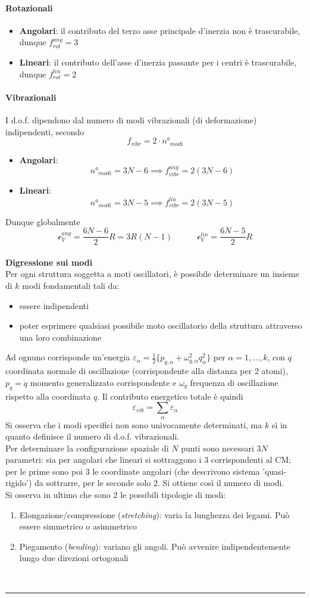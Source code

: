 \documentclass[10pt, oneside]{book}
\newcommand{\infobox}[2]{\vspace{0.5cm}~\\ \textbf{#1} \hrulefill \vspace{0.2cm}\\#2 {}\,\\\hrule \vspace{0.5cm}}
\newcommand{\ds}{\displaystyle}
\newcommand{\molhtv}{\mathcal{c}_V }
\begin{document}
\paragraph{Rotazionali} 
\begin{itemize}
\item \textbf{Angolari}: il contributo del terzo asse principale d'inerzia non è trascurabile, dunque $\ds f_{rot}^{ang} = 3$
\item \textbf{Lineari}: il contributo dell'asse d'inerzia passante per i centri è trascurabile, dunque $\ds f_{rot}^{lin} = 2$
\end{itemize}
\paragraph{Vibrazionali}
I d.o.f. dipendono dal numero di modi vibrazionali (di deformazione) indipendenti, secondo \[f_{vibr} = 2 \cdot n°_{modi}\]
\begin{itemize}
\item \textbf{Angolari}:
\[n°_{modi} = 3N - 6 \implies f_{vibr}^{ang} = 2 (3N - 6)\]
\item \textbf{Lineari}: \[n°_{modi} = 3N - 5 \implies f_{vibr}^{lin} = 2 (3N - 5)\]
\end{itemize}
Dunque globalmente
\[\molhtv^{ang} = \frac{6N - 6}{2} R = 3R (N-1) \quad \quad \quad \molhtv^{lin} = \frac{6N - 5}{2} R \]
\infobox{Digressione sui modi}{Per ogni struttura soggetta a moti oscillatori, è possibile determinare un insieme di $k$ modi fondamentali tali da:
\begin{itemize}
\item essere indipendenti
\item poter esprimere qualsiasi possibile moto oscillatorio della struttura attraverso una loro combinazione
\end{itemize}
Ad ognuno corrisponde un'energia $\ds \varepsilon_\alpha = \frac{1}{2}\{p_{q, \alpha} + \omega_{q, \alpha}^2 q_\alpha^2\}$ per $\alpha = 1, ..., k$, con $q$ coordinata normale di oscillazione (corrispondente alla distanza per 2 atomi), $p_q = \dot q$ momento generalizzato corrispondente e $\omega_q$ frequenza di oscillazione rispetto alla coordinata $q$. Il contributo energetico totale è quindi
\[\varepsilon_{vib} = \sum_\alpha \varepsilon_\alpha\]
Si osserva che i modi specifici non sono univocamente determinati, ma $k$ sì in quanto definisce il numero di d.o.f. vibrazionali.\\
Per determinare la configurazione spaziale di $N$ punti sono necessari $3N$ parametri: sia per angolari che lineari si sottraggono i $3$ corrispondenti al CM; per le prime sono poi $3$ le coordinate angolari (che descrivono sistema 'quasi-rigido') da sottrarre, per le seconde solo $2$. Si ottiene così il numero di modi.\\
Si osserva in ultimo che sono 2 le possibili tipologie di modi:
\begin{enumerate}
\item Elongazione/compressione (\textit{stretching}): varia la lunghezza dei legami. Può essere simmetrico o asimmetrico
\item Piegamento (\textit{bending}): variano gli angoli. Può avvenire indipendentemente lungo due direzioni ortogonali
\end{enumerate}}
\end{document}

